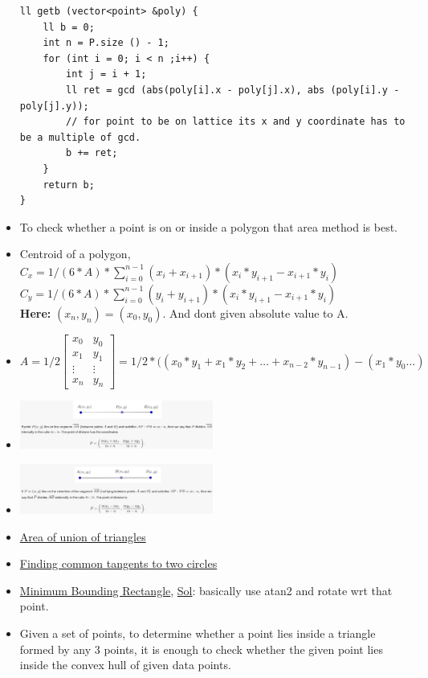 \documentclass[8pt, a4paper, oneside, twocolumn]{extarticle}
\begin{document}
\begin{itemize}
\begin{verbatim}
ll getb (vector<point> &poly) {
    ll b = 0;
    int n = P.size () - 1;
    for (int i = 0; i < n ;i++) {
        int j = i + 1; 
        ll ret = gcd (abs(poly[i].x - poly[j].x), abs (poly[i].y - poly[j].y));
        // for point to be on lattice its x and y coordinate has to be a multiple of gcd.
        b += ret;
    }
    return b;
}
    \end{verbatim}
    \item To check whether a point is on or inside a polygon that area method is best.
    \item Centroid of a polygon, $C_x = 1/(6*A)*\sum_{i = 0}^{n - 1}(x_i + x_{i + 1}) * (x_i * y_{i + 1} - x_{i + 1} * y_i)$
    \\$C_y = 1/(6*A)*\sum_{i = 0}^{n - 1}(y_i + y_{i + 1}) * (x_i * y_{i + 1} - x_{i + 1} * y_i)$
    \\\textbf{Here: }$(x_n, y_n) = (x_0, y_0)$. And dont given absolute value to A.
    \item \[A = 1/2\begin{bmatrix}
    x_0 & y_0\\
    x_1 & y_1\\
    \vdots & \vdots\\
    x_n & y_n
    \end{bmatrix} = 1/2 * ((x_0 * y_1 + x_1 * y_2 + \dots + x_{n - 2} * y_{n - 1}) - (x_1*y_0 \dots)\]
    \item \includegraphics[width=0.5\textwidth,height=0.5\textheight,keepaspectratio]{p1} 
    \item \includegraphics[width=0.5\textwidth,height=0.5\textheight,keepaspectratio]{p2}
    \item \href{https://github.com/sourabh2311/Competitive-Programming/blob/master/Libs/areaOfUnionOfTriangles.cpp}{Area of union of triangles}
    \item \href{http://e-maxx.ru/algo/circle_tangents}{Finding common tangents to two circles}
    \item \href{https://uva.onlinejudge.org/external/101/10173.pdf}{Minimum Bounding Rectangle}, \href{https://github.com/sourabh2311/Competitive-Programming/blob/master/UVA_10173.cpp}{Sol}: basically use atan2 and rotate wrt that point.
    \item Given a set of points, to determine whether a point lies inside a triangle formed by any 3 points, it is enough to check whether the given point lies inside the convex hull of given data points.
\end{itemize}
\end{document}
